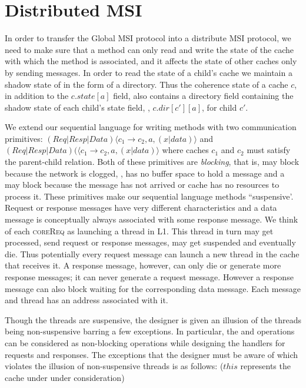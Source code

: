 \section{Distributed MSI}
\label{sec:DistributedMsi}


In order to transfer the Global MSI protocol into a distribute MSI protocol, we
need to make sure that a method can only read and write the state of the cache
with which the method is associated, and it affects the state of other caches
only by sending messages. In order to read the state of a child's cache we
maintain a shadow state of in the form of a directory. Thus the coherence state
of a cache $c$, in addition to the $c.state[a]$ field, also contains a
directory field containing the shadow state of each child's state field, \ie,
$c.dir[c'][a]$, for child $c'$.

We extend our sequential language for writing methods with two communication
primitives: \send{} $(Req|Resp|Data)\langle c_1 \rightarrow c_2, a,
(x|data)\rangle$ and \receive{} $(Req|Resp|Data)(\langle c_1 \rightarrow c_2,
a, (x|data)\rangle$ where caches $c_1$ and $c_2$ must satisfy the parent-child
relation. Both of these primitives are \emph{blocking}, that is, \send{} may
block because the network is clogged, \ie, has no buffer space to hold a
message and a \receive{} may block because the message has not arrived or cache
has no resources to process it. These primitives make our sequential language
methods ``suspensive'. Request or response messages have very different
characteristics and a data message is conceptually always associated with some
response message. We think of each \textsc{coreReq} as launching a thread in
L1. This thread in turn may get processed, send request or response messages,
may get suspended and eventually die. Thus potentially every request message
can launch a new thread in the cache that receives it. A response message,
however, can only die or generate more response messages; it can never generate
a request message. However a response message can also block waiting for the
corresponding data message. Each message and thread has an address associated
with it.

Though the threads are suspensive, the designer is given an illusion of the
threads being non-suspensive barring a few exceptions. In particular, the
\send{} and \receive{} operations can be considered as non-blocking operations
while designing the handlers for requests and responses. The exceptions that the
designer must be aware of which violates the illusion of non-suspensive threads
is as follows: ($this$ represents the cache under under consideration)

